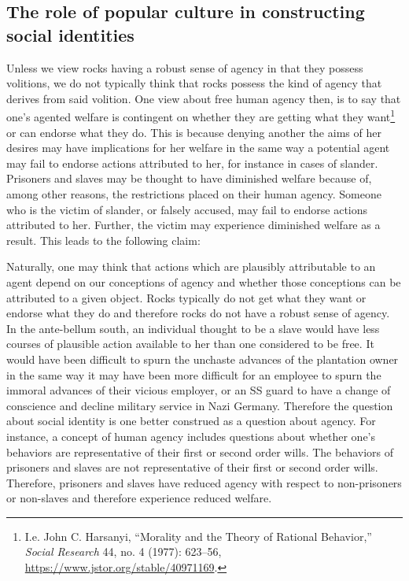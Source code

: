 \documentclass[phdthesis,12pt,final]{wuthesis}
\theoremstyle{definition}
\theoremstyle{definition}
\theoremstyle{definition}
\theoremstyle{definition}
\theoremstyle{remark}
\begin{document}
\subsection*{The role of popular culture in constructing social identities}\label{the-role-of-popular-culture-in-constructing-social-identities}

Unless we view rocks having a robust sense of agency in that they possess volitions, we do not typically think that rocks possess the kind of agency that derives from said volition. One view about free human agency then, is to say that one's agented welfare is contingent on whether they are getting what they want\footnote{I.e. John C. Harsanyi, {``Morality and the {Theory} of {Rational Behavior},''} \emph{Social Research} 44, no. 4 (1977): 623--56, \url{https://www.jstor.org/stable/40971169}.} or can endorse what they do. This is because denying another the aims of her desires may have implications for her welfare in the same way a potential agent may fail to endorse actions attributed to her, for instance in cases of slander. Prisoners and slaves may be thought to have diminished welfare because of, among other reasons, the restrictions placed on their human agency. Someone who is the victim of slander, or falsely accused, may fail to endorse actions attributed to her. Further, the victim may experience diminished welfare as a result. This leads to the following claim:

\begin{Shaded}
\begin{Highlighting}[]
\end{Highlighting}
\end{Shaded}

Naturally, one may think that actions which are plausibly attributable to an agent depend on our conceptions of agency and whether those conceptions can be attributed to a given object. Rocks typically do not get what they want or endorse what they do and therefore rocks do not have a robust sense of agency. In the ante-bellum south, an individual thought to be a slave would have less courses of plausible action available to her than one considered to be free. It would have been difficult to spurn the unchaste advances of the plantation owner in the same way it may have been more difficult for an employee to spurn the immoral advances of their vicious employer, or an SS guard to have a change of conscience and decline military service in Nazi Germany. Therefore the question about social identity is one better construed as a question about agency. For instance, a concept of human agency includes questions about whether one's behaviors are representative of their first or second order wills. The behaviors of prisoners and slaves are not representative of their first or second order wills. Therefore, prisoners and slaves have reduced agency with respect to non-prisoners or non-slaves and therefore experience reduced welfare.
\end{document}
